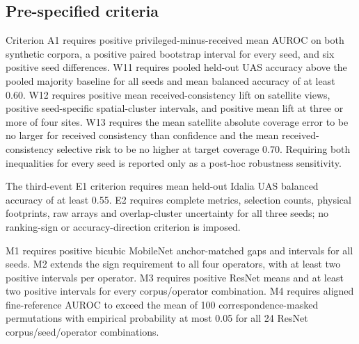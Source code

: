 \subsection{Pre-specified criteria}

Criterion A1 requires positive privileged-minus-received mean AUROC on both
synthetic corpora, a positive paired bootstrap interval for every seed, and six
positive seed differences. W11 requires pooled held-out UAS accuracy above the
pooled majority baseline for all seeds and mean balanced accuracy of at least
0.60. W12 requires positive mean received-consistency lift on satellite views,
positive seed-specific spatial-cluster intervals, and positive mean lift at
three or more of four sites. W13 requires the mean satellite absolute coverage
error to be no larger for received consistency than confidence and the mean
received-consistency selective risk to be no higher at target coverage 0.70.
Requiring both inequalities for every seed is reported only as a post-hoc
robustness sensitivity.

The third-event E1 criterion requires mean held-out Idalia UAS balanced
accuracy of at least 0.55. E2 requires complete metrics, selection counts,
physical footprints, raw arrays and overlap-cluster uncertainty for all three
seeds; no ranking-sign or accuracy-direction criterion is imposed.

M1 requires positive bicubic MobileNet anchor-matched gaps and intervals for
all seeds. M2 extends the sign requirement to all four operators, with at least
two positive intervals per operator. M3 requires positive ResNet means and at
least two positive intervals for every corpus/operator combination. M4 requires
aligned fine-reference AUROC to exceed the mean of 100 correspondence-masked
permutations with empirical probability at most 0.05 for all 24
ResNet corpus/seed/operator combinations.
